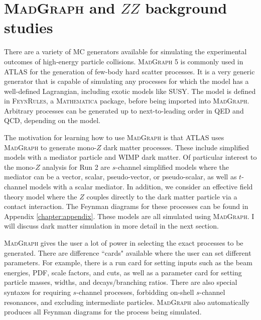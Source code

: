 \section{\textsc{MadGraph} and $ZZ$ background studies}
\label{sec:mg}

There are a variety of MC generators available for simulating the experimental outcomes of high-energy particle collisions. \textsc{MadGraph 5} is commonly used in ATLAS for the generation of few-body hard scatter processes. It is a very generic generator that is capable of simulating any processes for which the model has a well-defined Lagrangian, including exotic models like SUSY. The model is defined in \textsc{FeynRules}, a \textsc{Mathematica} package, before being imported into \textsc{MadGraph}. Arbitrary processes can be generated up to next-to-leading order in QED and QCD, depending on the model.

The motivation for learning how to use \textsc{MadGraph} is that ATLAS uses \textsc{MadGraph} to generate mono-$Z$ dark matter processes. These include simplified models with a mediator particle and WIMP dark matter. Of particular interest to the mono-$Z$ analysis for Run 2 are $s$-channel simplified models where the mediator can be a vector, scalar, pseudo-vector, or pseudo-scalar, as well as $t$-channel models with a scalar mediator. In addition, we consider an effective field theory model where the $Z$ couples directly to the dark matter particle via a contact interaction. The Feynman diagrams for these processes can be found in Appendix \ref{chapter:appendix}. These models are all simulated using \textsc{MadGraph}. I will discuss dark matter simulation in more detail in the next section.

\textsc{MadGraph} gives the user a lot of power in selecting the exact processes to be generated. There are difference ``cards" available where the user can set different parameters. For example, there is a run card for setting inputs such as the beam energies, PDF, scale factors, and cuts, as well as a parameter card for setting particle masses, widths, and decays/branching ratios. There are also special syntaxes for requiring $s$-channel processes, forbidding on-shell $s$-channel resonances, and excluding intermediate particles. \textsc{MadGraph} also automatically produces all Feynman diagrams for the process being simulated.

